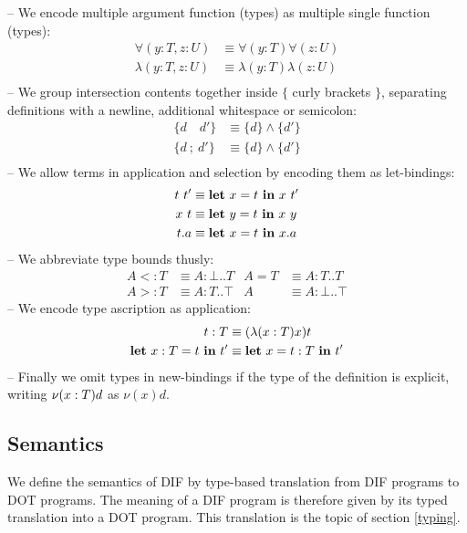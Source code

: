 \noindent -- We encode multiple argument function (types) as multiple single
function (types):
\begin{align*}
    \forall(y: T, z: U) &\equiv \forall(y: T)\forall(z: U) \\
    \lambda(y: T, z: U) &\equiv \lambda(y: T)\lambda(z: U) \\
\end{align*}
\noindent -- We group intersection contents together inside $\{$ curly brackets
$\}$, separating definitions with a newline, additional whitespace or semicolon:
\begin{align*}
    \{d \quad d'\} &\equiv \{d\} \wedge \{d'\} \\
    \{d \ ;\  d'\} &\equiv \{d\} \wedge \{d'\} \\
\end{align*}
\noindent -- We allow terms in application and selection by encoding them as
let-bindings:
\begin{align*}
    t\ t' &\equiv \textbf{let}\ x = t\ \textbf{in}\ x\ t' \\
    x\ t &\equiv \textbf{let}\ y = t\ \textbf{in}\ x\ y \\
    t.a &\equiv \textbf{let}\ x = t\ \textbf{in}\ x.a
\end{align*}
\noindent -- We abbreviate type bounds thusly:
\begin{align*}
    A <: T &\equiv A: \bot..T & A = T &\equiv A: T..T \\
    A >: T &\equiv A: T..\top & A &\equiv A: \bot..\top
\end{align*}
\noindent -- We encode type ascription as application:
\begin{align*}
    t: T &\equiv (\lambda(x:T)x)t \\
    \textbf{let}\ x: T = t\ \textbf{in}\ t' &\equiv \textbf{let}\ x = t: T\ \textbf{in}\ t'
\end{align*}
\noindent -- Finally we omit types in new-bindings if the type of the definition
is explicit, writing $\nu(x:T)d$ as $\nu(x)d$.

\subsection{Semantics}
We define the semantics of DIF by type-based translation from DIF programs to
DOT programs. The meaning of a DIF program is therefore given by its typed
translation into a DOT program. This translation is the topic of section
\ref{typing}.
